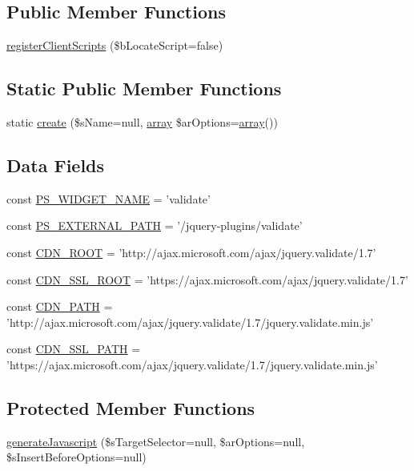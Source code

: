 \subsection*{Public Member Functions}
\begin{DoxyCompactItemize}
\item 
\hyperlink{classCPSjqValidate_ac02a66bde8e72e4909137bf748edf665}{registerClientScripts} (\$bLocateScript=false)
\end{DoxyCompactItemize}
\subsection*{Static Public Member Functions}
\begin{DoxyCompactItemize}
\item 
static \hyperlink{classCPSjqValidate_a0ffc269a208148ade57c7eb608a4562a}{create} (\$sName=null, \hyperlink{list_8php_aa3205d038c7f8feb5c9f01ac4dfadc88}{array} \$arOptions=\hyperlink{list_8php_aa3205d038c7f8feb5c9f01ac4dfadc88}{array}())
\end{DoxyCompactItemize}
\subsection*{Data Fields}
\begin{DoxyCompactItemize}
\item 
const \hyperlink{classCPSjqValidate_ae357f9dc377f7de0d12010b2ced28cbc}{PS\_\-WIDGET\_\-NAME} = 'validate'
\item 
const \hyperlink{classCPSjqValidate_a8ccb5e1d65c091f944a6aa8c5be834ca}{PS\_\-EXTERNAL\_\-PATH} = '/jquery-\/plugins/validate'
\item 
const \hyperlink{classCPSjqValidate_a2f10f690c9bdb966a20b0c1fedd4e9d7}{CDN\_\-ROOT} = 'http://ajax.microsoft.com/ajax/jquery.validate/1.7'
\item 
const \hyperlink{classCPSjqValidate_a66a542d2b3dc21378203a6c741b80b28}{CDN\_\-SSL\_\-ROOT} = 'https://ajax.microsoft.com/ajax/jquery.validate/1.7'
\item 
const \hyperlink{classCPSjqValidate_a25f81b1e2d2ce6f2521bc8c4c4877382}{CDN\_\-PATH} = 'http://ajax.microsoft.com/ajax/jquery.validate/1.7/jquery.validate.min.js'
\item 
const \hyperlink{classCPSjqValidate_ae2b9c6713d89ec8f2d3d7ab20e74c9c5}{CDN\_\-SSL\_\-PATH} = 'https://ajax.microsoft.com/ajax/jquery.validate/1.7/jquery.validate.min.js'
\end{DoxyCompactItemize}
\subsection*{Protected Member Functions}
\begin{DoxyCompactItemize}
\item 
\hyperlink{classCPSjqValidate_a273c0dc58b59db25cfd5a37561bccec5}{generateJavascript} (\$sTargetSelector=null, \$arOptions=null, \$sInsertBeforeOptions=null)
\end{DoxyCompactItemize}


